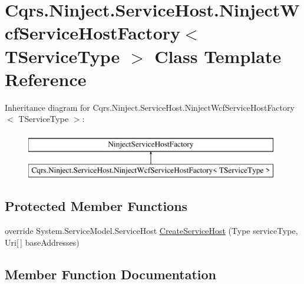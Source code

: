 \hypertarget{classCqrs_1_1Ninject_1_1ServiceHost_1_1NinjectWcfServiceHostFactory}{}\section{Cqrs.\+Ninject.\+Service\+Host.\+Ninject\+Wcf\+Service\+Host\+Factory$<$ T\+Service\+Type $>$ Class Template Reference}
\label{classCqrs_1_1Ninject_1_1ServiceHost_1_1NinjectWcfServiceHostFactory}
Inheritance diagram for Cqrs.\+Ninject.\+Service\+Host.\+Ninject\+Wcf\+Service\+Host\+Factory$<$ T\+Service\+Type $>$\+:\begin{figure}[H]
\begin{center}
\leavevmode
\includegraphics[height=2.000000cm]{classCqrs_1_1Ninject_1_1ServiceHost_1_1NinjectWcfServiceHostFactory}
\end{center}
\end{figure}
\subsection*{Protected Member Functions}
\begin{DoxyCompactItemize}
\item 
override System.\+Service\+Model.\+Service\+Host \hyperlink{classCqrs_1_1Ninject_1_1ServiceHost_1_1NinjectWcfServiceHostFactory_aea8f1d5ab6287ef4abf7145d5467cdd5_aea8f1d5ab6287ef4abf7145d5467cdd5}{Create\+Service\+Host} (Type service\+Type, Uri\mbox{[}$\,$\mbox{]} base\+Addresses)
\end{DoxyCompactItemize}


\subsection{Member Function Documentation}
\mbox{\label{classCqrs_1_1Ninject_1_1ServiceHost_1_1NinjectWcfServiceHostFactory_aea8f1d5ab6287ef4abf7145d5467cdd5_aea8f1d5ab6287ef4abf7145d5467cdd5}} 
